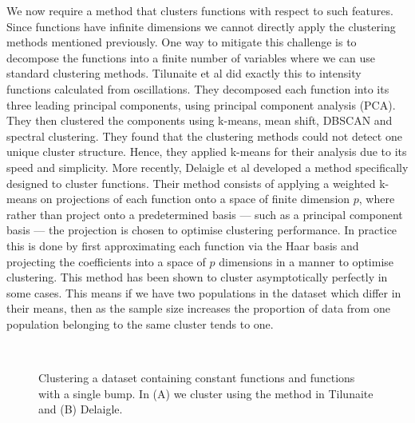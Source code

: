 \documentclass[12pt]{book} %
\begin{document}
We now require a method that clusters functions with respect to such features. 
Since functions have infinite dimensions we cannot directly apply the clustering methods mentioned previously. One way to mitigate this challenge is to decompose the functions into a finite number of variables where we can use standard clustering methods. Tilunaite et al \cite{} did exactly this to intensity functions calculated from  oscillations. They decomposed each  function into its three leading principal components, using principal component analysis (PCA). They then clustered the components using k-means, mean shift, DBSCAN and spectral clustering. They found that the clustering methods could not detect one unique cluster structure. Hence, they applied k-means for their analysis due to its speed and simplicity. More recently, Delaigle et al \cite{} developed a method specifically designed to cluster functions. Their method consists of applying a weighted k-means on projections of each function onto a space of finite dimension $p$, where rather than project onto a predetermined basis ---  such as a principal component basis --- the projection is chosen to optimise clustering performance. In practice this is done by first approximating each function via the Haar basis and projecting the coefficients into a space of $p$ dimensions in a manner to optimise clustering. This method has been shown to cluster asymptotically perfectly in some cases. This means if we have two populations in the dataset which differ in their means, then as the sample size increases the proportion of data from one population belonging to the same cluster tends to one.  

     \begin{figure}[ht!]
   \hrulefill
   \begin{center} 
   \quad
      \\ 
    \end{center}     
    \caption{Clustering a dataset containing constant functions and functions with a single bump. In (A) we cluster using the method in Tilunaite and (B) Delaigle.}
    \label{fig:FitBad}
    \hrulefill
    \end{figure}
\end{document}
